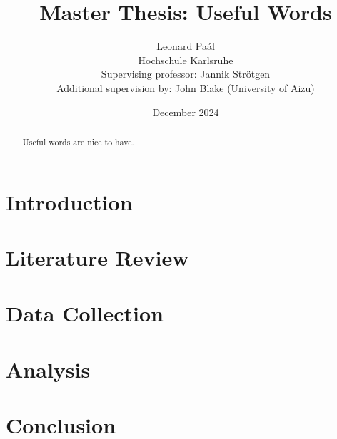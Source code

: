\documentclass[12pt]{report}
\title{Master Thesis: Useful Words}
\author{Leonard Paál\\Hochschule Karlsruhe\\Supervising professor: Jannik Strötgen\\Additional supervision by: John Blake (University of Aizu)}
\date{December 2024}
\begin{document}
\maketitle
\begin{abstract}
	\noindent Useful words are nice to have.
\end{abstract}

\clearpage
\tableofcontents
\listoffigures
\listoftables
\clearpage

\chapter{Introduction}

\chapter{Literature Review}

\chapter{Data Collection}

\chapter{Analysis}

\chapter{Conclusion}




\end{document}

